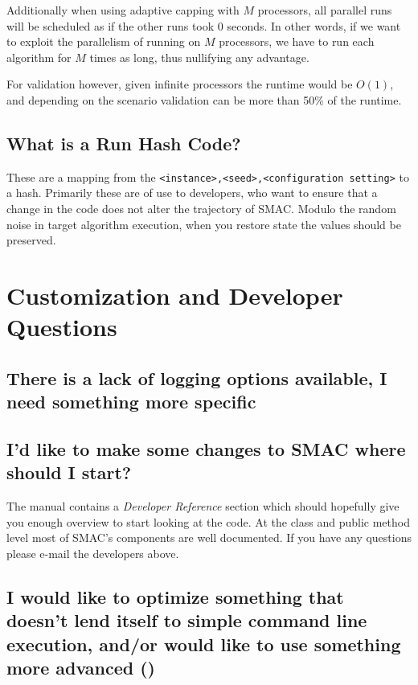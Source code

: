 \documentclass[11pt,letterpaper,oneside]{article}
\begin{document}
	Additionally when using adaptive capping with $M$ processors, all parallel runs will be scheduled as if the other runs took 0 seconds. In other words, if we want to exploit the parallelism of running on $M$ processors, we have to run each algorithm for $M$ times as long, thus nullifying any advantage.
	
	For validation however, given infinite processors the runtime would be $O(1)$, and depending on the scenario validation can be more than 50\% of the runtime.


\subsection{What is a Run Hash Code?}

These are a mapping from the \texttt{<instance>,<seed>,<configuration setting>} to a hash. Primarily these are of use to developers, who want to ensure that a change in the code does not alter the trajectory of SMAC. Modulo the random noise in target algorithm execution, when you restore state the values should be preserved.




	
\section{Customization and Developer Questions}

\subsection{There is a lack of logging options available, I need something more specific}
\label{sec:alternative-logging}
	

	
	
\subsection{I'd like to make some changes to SMAC where should I start?}

	The manual contains a \emph{Developer Reference} section which should hopefully give you enough overview to start looking at the code. At the class and public method level most of SMAC's components are well documented. If you have any questions please e-mail the developers above.

\subsection{I would like to optimize something that doesn't lend itself to simple command line execution, and/or would like to use something more advanced ()}
\end{document}
